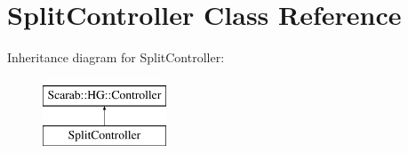 \hypertarget{class_split_controller}{
\section{SplitController Class Reference}
\label{class_split_controller}
}
Inheritance diagram for SplitController:\begin{figure}[H]
\begin{center}
\leavevmode
\includegraphics[height=2cm]{class_split_controller}
\end{center}
\end{figure}
